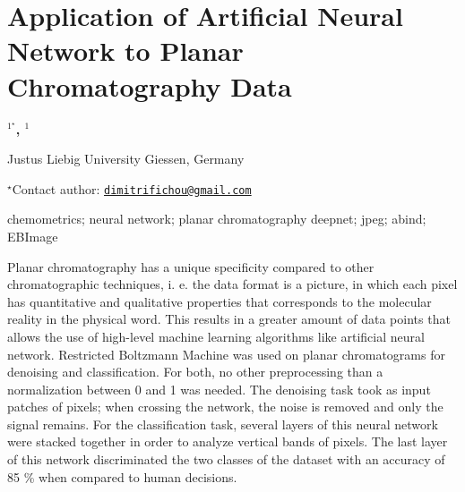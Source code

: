 \documentclass[\main/boa.tex]{subfiles}
\begin{document}
\section{Application of Artificial Neural Network to Planar Chromatography Data}

\begin{center}
  {\bf {}$^{1^\star}$, $^{1}$}
\end{center}

\vskip 0.3cm

\begin{affiliations}
\begin{enumerate}
\begin{minipage}{0.915\textwidth}
\centering
\item Justus Liebig University Giessen, Germany \\[-2pt]
\end{minipage}
\end{enumerate}
$^\star$Contact author: \href{mailto:dimitrifichou@gmail.com}{\nolinkurl{dimitrifichou@gmail.com}}\\
\end{affiliations}

\vskip 0.5cm

\begin{minipage}{0.915\textwidth}
\keywords chemometrics; neural network; planar chromatography
\packages deepnet; jpeg; abind; EBImage
\end{minipage}

\vskip 0.8cm

Planar chromatography has a unique specificity compared to other
chromatographic techniques, i. e. the data format is a picture, in which
each pixel has quantitative and qualitative properties that corresponds
to the molecular reality in the physical word. This results in a greater
amount of data points that allows the use of high-level machine learning
algorithms like artificial neural network. Restricted Boltzmann Machine
was used on planar chromatograms for denoising and classification. For
both, no other preprocessing than a normalization between 0 and 1 was
needed. The denoising task took as input patches of pixels; when
crossing the network, the noise is removed and only the signal remains.
For the classification task, several layers of this neural network were
stacked together in order to analyze vertical bands of pixels. The last
layer of this network discriminated the two classes of the dataset with
an accuracy of 85 \% when compared to human decisions.
\end{document}
